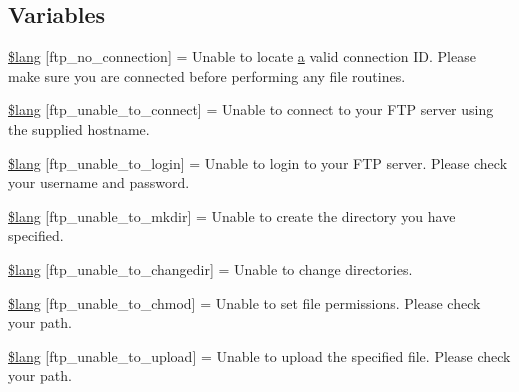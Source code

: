 \subsection*{Variables}
\begin{DoxyCompactItemize}
\item 
\hyperlink{_admin_2system_2language_2english_2ftp__lang_8php_a8630404f8e0c3750f8d997f35622b6eb}{\$lang} \mbox{[}\textquotesingle{}ftp\+\_\+no\+\_\+connection\textquotesingle{}\mbox{]} = \textquotesingle{}Unable to locate \hyperlink{_admin_2assets_2js_2bootstrap_8min_8js_a1f5870dcf487187f13d5fd328ed9e6e7}{a} valid connection I\+D. Please make sure you are connected before performing any file routines.\textquotesingle{}
\item 
\hyperlink{_admin_2system_2language_2english_2ftp__lang_8php_a57d51cf019dd2e380b84c6e31cda0cf5}{\$lang} \mbox{[}\textquotesingle{}ftp\+\_\+unable\+\_\+to\+\_\+connect\textquotesingle{}\mbox{]} = \textquotesingle{}Unable to connect to your F\+T\+P server using the supplied hostname.\textquotesingle{}
\item 
\hyperlink{_admin_2system_2language_2english_2ftp__lang_8php_affe13cbf898e1802abb3cd9d9ce2db97}{\$lang} \mbox{[}\textquotesingle{}ftp\+\_\+unable\+\_\+to\+\_\+login\textquotesingle{}\mbox{]} = \textquotesingle{}Unable to login to your F\+T\+P server. Please check your username and password.\textquotesingle{}
\item 
\hyperlink{_admin_2system_2language_2english_2ftp__lang_8php_acd954089043ea7ad47397376e2630d87}{\$lang} \mbox{[}\textquotesingle{}ftp\+\_\+unable\+\_\+to\+\_\+mkdir\textquotesingle{}\mbox{]} = \textquotesingle{}Unable to create the directory you have specified.\textquotesingle{}
\item 
\hyperlink{_admin_2system_2language_2english_2ftp__lang_8php_a2e8eab1a2d2d33cde249097df270b7df}{\$lang} \mbox{[}\textquotesingle{}ftp\+\_\+unable\+\_\+to\+\_\+changedir\textquotesingle{}\mbox{]} = \textquotesingle{}Unable to change directories.\textquotesingle{}
\item 
\hyperlink{_admin_2system_2language_2english_2ftp__lang_8php_a9ffd10144a0dfd5a3c7ab69e4edf1fdf}{\$lang} \mbox{[}\textquotesingle{}ftp\+\_\+unable\+\_\+to\+\_\+chmod\textquotesingle{}\mbox{]} = \textquotesingle{}Unable to set file permissions. Please check your path.\textquotesingle{}
\item 
\hyperlink{_admin_2system_2language_2english_2ftp__lang_8php_a1fd0c9f4e0f3be691a809ce804900ed7}{\$lang} \mbox{[}\textquotesingle{}ftp\+\_\+unable\+\_\+to\+\_\+upload\textquotesingle{}\mbox{]} = \textquotesingle{}Unable to upload the specified file. Please check your path.\textquotesingle{}

\end{DoxyCompactItemize}
